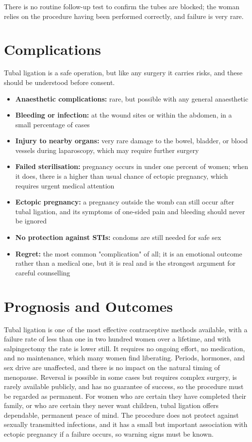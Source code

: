There is no routine follow-up test to confirm the tubes are blocked; the woman relies on the procedure having been performed correctly, and failure is very rare.

\section*{Complications}
Tubal ligation is a safe operation, but like any surgery it carries risks, and these should be understood before consent.

\begin{itemize}
    \item \textbf{Anaesthetic complications:} rare, but possible with any general anaesthetic
    \item \textbf{Bleeding or infection:} at the wound sites or within the abdomen, in a small percentage of cases
    \item \textbf{Injury to nearby organs:} very rare damage to the bowel, bladder, or blood vessels during laparoscopy, which may require further surgery
    \item \textbf{Failed sterilisation:} pregnancy occurs in under one percent of women; when it does, there is a higher than usual chance of ectopic pregnancy, which requires urgent medical attention
    \item \textbf{Ectopic pregnancy:} a pregnancy outside the womb can still occur after tubal ligation, and its symptoms of one-sided pain and bleeding should never be ignored
    \item \textbf{No protection against STIs:} condoms are still needed for safe sex
    \item \textbf{Regret:} the most common "complication" of all; it is an emotional outcome rather than a medical one, but it is real and is the strongest argument for careful counselling
\end{itemize}

\section*{Prognosis and Outcomes}
Tubal ligation is one of the most effective contraceptive methods available, with a failure rate of less than one in two hundred women over a lifetime, and with salpingectomy the rate is lower still. It requires no ongoing effort, no medication, and no maintenance, which many women find liberating. Periods, hormones, and sex drive are unaffected, and there is no impact on the natural timing of menopause. Reversal is possible in some cases but requires complex surgery, is rarely available publicly, and has no guarantee of success, so the procedure must be regarded as permanent. For women who are certain they have completed their family, or who are certain they never want children, tubal ligation offers dependable, permanent peace of mind. The procedure does not protect against sexually transmitted infections, and it has a small but important association with ectopic pregnancy if a failure occurs, so warning signs must be known.

